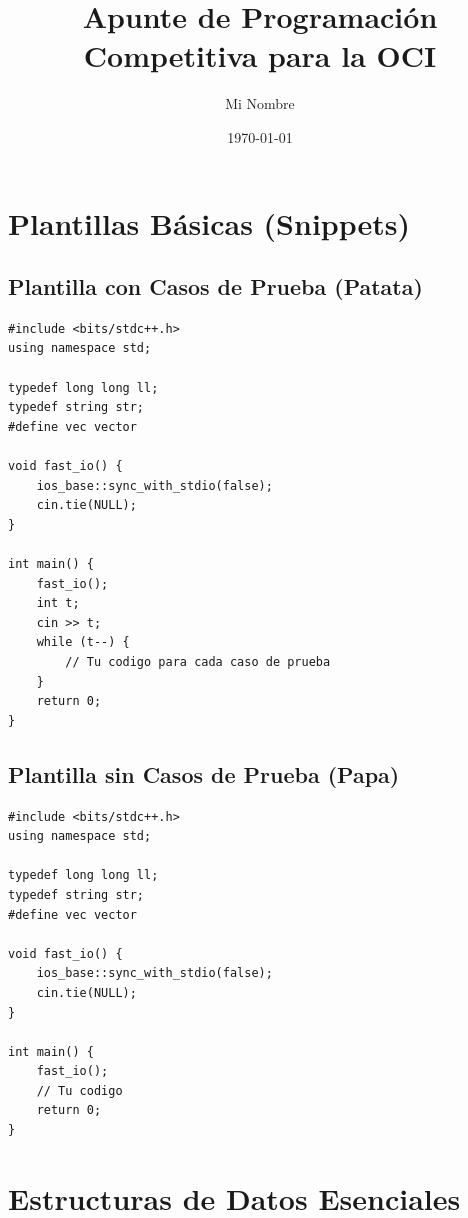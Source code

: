 \documentclass[11pt, a4paper]{article}
\title{Apunte de Programación Competitiva para la OCI}
\author{Mi Nombre} %
\date{\today}
\begin{document}
\maketitle
\tableofcontents
\newpage

\section{Plantillas Básicas (Snippets)}

\subsection{Plantilla con Casos de Prueba (Patata)}
\begin{lstlisting}
#include <bits/stdc++.h>
using namespace std;

typedef long long ll;
typedef string str;
#define vec vector

void fast_io() {
    ios_base::sync_with_stdio(false);
    cin.tie(NULL);
}

int main() {
    fast_io();
    int t;
    cin >> t;
    while (t--) {
        // Tu codigo para cada caso de prueba
    }
    return 0;
}
\end{lstlisting}

\subsection{Plantilla sin Casos de Prueba (Papa)}
\begin{lstlisting}
#include <bits/stdc++.h>
using namespace std;

typedef long long ll;
typedef string str;
#define vec vector

void fast_io() {
    ios_base::sync_with_stdio(false);
    cin.tie(NULL);
}

int main() {
    fast_io();
    // Tu codigo
    return 0;
}
\end{lstlisting}

\section{Estructuras de Datos Esenciales}
\end{document}
